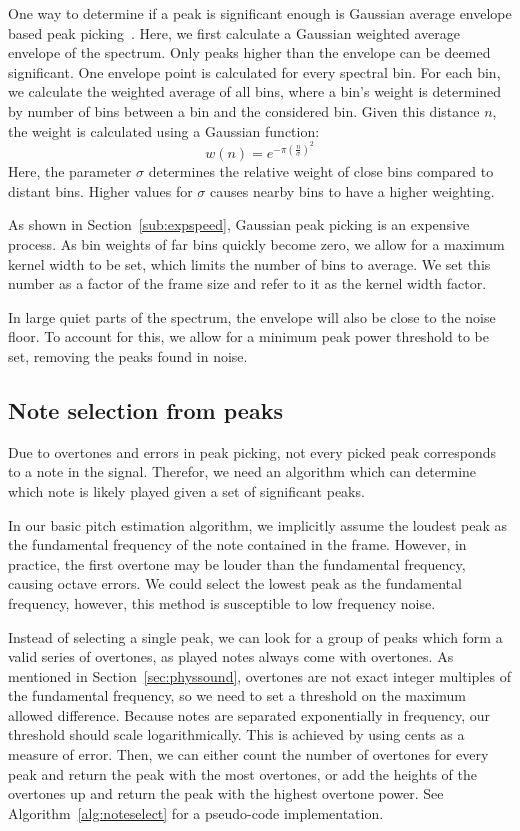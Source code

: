 \documentclass[a4paper,10pt,twocolumn]{article}
\begin{document}
One way to determine if a peak is significant enough is Gaussian average envelope based peak picking~\cite{gausvelope}. Here, we first calculate a Gaussian weighted average envelope of the spectrum. Only peaks higher than the envelope can be deemed significant. One envelope point is calculated for every spectral bin. For each bin, we calculate the weighted average of all bins, where a bin's weight is determined by number of bins between a bin and the considered bin. Given this distance $n$, the weight is calculated using a Gaussian function:
\[ w(n) = e^{-\pi (\frac{n}{\sigma})^2} \]
Here, the parameter $\sigma$ determines the relative weight of close bins compared to distant bins. Higher values for $\sigma$ causes nearby bins to have a higher weighting.

As shown in Section~\ref{sub:expspeed}, Gaussian peak picking is an expensive process. As bin weights of far bins quickly become zero, we allow for a maximum kernel width to be set, which limits the number of bins to average. We set this number as a factor of the frame size and refer to it as the kernel width factor.

In large quiet parts of the spectrum, the envelope will also be close to the noise floor. To account for this, we allow for a minimum peak power threshold to be set, removing the peaks found in noise.


\subsection{Note selection from peaks}
Due to overtones and errors in peak picking, not every picked peak corresponds to a note in the signal. Therefor, we need an algorithm which can determine which note is likely played given a set of significant peaks.

In our basic pitch estimation algorithm, we implicitly assume the loudest peak as the fundamental frequency of the note contained in the frame. However, in practice, the first overtone may be louder than the fundamental frequency, causing octave errors. We could select the lowest peak as the fundamental frequency, however, this method is susceptible to low frequency noise.

Instead of selecting a single peak, we can look for a group of peaks which form a valid series of overtones, as played notes always come with overtones. As mentioned in Section~\ref{sec:physsound}, overtones are not exact integer multiples of the fundamental frequency, so we need to set a threshold on the maximum allowed difference. Because notes are separated exponentially in frequency, our threshold should scale logarithmically. This is achieved by using cents as a measure of error. Then, we can either count the number of overtones for every peak and return the peak with the most overtones, or add the heights of the overtones up and return the peak with the highest overtone power. See Algorithm~\ref{alg:noteselect} for a pseudo-code implementation.
\end{document}
